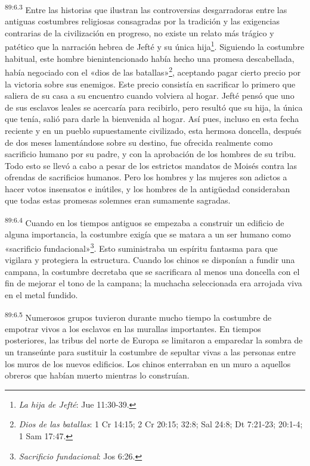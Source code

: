 \par
\textsuperscript{89:6.3} Entre las historias que ilustran las controversias desgarradoras entre las antiguas costumbres religiosas consagradas por la tradición y las exigencias contrarias de la civilización en progreso, no existe un relato más trágico y patético que la narración hebrea de Jefté y su única hija\footnote{\textit{La hija de Jefté}: Jue 11:30-39.}. Siguiendo la costumbre habitual, este hombre bienintencionado había hecho una promesa descabellada, había negociado con el «dios de las batallas»\footnote{\textit{Dios de las batallas}: 1 Cr 14:15; 2 Cr 20:15; 32:8; Sal 24:8; Dt 7:21-23; 20:1-4; 1 Sam 17:47.}, aceptando pagar cierto precio por la victoria sobre sus enemigos. Este precio consistía en sacrificar lo primero que saliera de su casa a su encuentro cuando volviera al hogar. Jefté pensó que uno de sus esclavos leales se acercaría para recibirlo, pero resultó que su hija, la única que tenía, salió para darle la bienvenida al hogar. Así pues, incluso en esta fecha reciente y en un pueblo supuestamente civilizado, esta hermosa doncella, después de dos meses lamentándose sobre su destino, fue ofrecida realmente como sacrificio humano por su padre, y con la aprobación de los hombres de su tribu. Todo esto se llevó a cabo a pesar de los estrictos mandatos de Moisés contra las ofrendas de sacrificios humanos. Pero los hombres y las mujeres son adictos a hacer votos insensatos e inútiles, y los hombres de la antig\"uedad consideraban que todas estas promesas solemnes eran sumamente sagradas.

\par
\textsuperscript{89:6.4} Cuando en los tiempos antiguos se empezaba a construir un edificio de alguna importancia, la costumbre exigía que se matara a un ser humano como «sacrificio fundacional»\footnote{\textit{Sacrificio fundacional}: Jos 6:26.}. Esto suministraba un espíritu fantasma para que vigilara y protegiera la estructura. Cuando los chinos se disponían a fundir una campana, la costumbre decretaba que se sacrificara al menos una doncella con el fin de mejorar el tono de la campana; la muchacha seleccionada era arrojada viva en el metal fundido.

\par
\textsuperscript{89:6.5} Numerosos grupos tuvieron durante mucho tiempo la costumbre de empotrar vivos a los esclavos en las murallas importantes. En tiempos posteriores, las tribus del norte de Europa se limitaron a emparedar la sombra de un transeúnte para sustituir la costumbre de sepultar vivas a las personas entre los muros de los nuevos edificios. Los chinos enterraban en un muro a aquellos obreros que habían muerto mientras lo construían.

